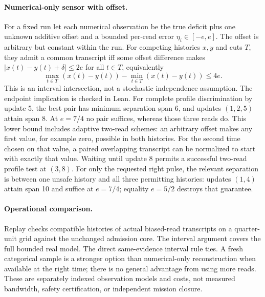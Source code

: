 \documentclass{article}
\begin{document}
\paragraph{Numerical-only sensor with offset.}
For a fixed run let each numerical observation be the true deficit
plus one unknown additive offset and a bounded per-read error
$\eta_i\in[-e,e]$. The offset is arbitrary but constant within the
run. For competing histories $x,y$ and cuts $T$, they admit a
common transcript iff some offset difference makes
$|x(t)-y(t)+\delta|\le 2e$ for all $t\in T$, equivalently
\[
 \max_{t\in T}(x(t)-y(t))-\min_{t\in T}(x(t)-y(t))\le4e.
\]
This is an interval intersection, not a stochastic independence
assumption. The endpoint implication is checked in Lean.
For complete profile discrimination by update 5, the best pair
has minimum separation span 6, and updates $(1,2,5)$ attain span
8. At $e=7/4$ no pair suffices, whereas those three reads do.
This lower bound includes adaptive two-read schemes: an arbitrary
offset makes any first value, for example zero, possible in
both histories. For the second time chosen on that value, a
paired overlapping transcript can be normalized to start with
exactly that value. Waiting until update 8 permits a successful
two-read profile test at $(3,8)$.
For only the requested right pulse, the relevant separation is
between one unsafe history and all three permitting histories:
updates $(1,4)$ attain span 10 and suffice at $e=7/4$; equality
$e=5/2$ destroys that guarantee.

\paragraph{Operational comparison.}
Replay checks compatible histories of actual biased-read transcripts
on a quarter-unit grid against the unchanged admission core. The
interval argument covers the full bounded real model. The direct
same-evidence interval rule ties. A fresh categorical sample is a
stronger option than numerical-only reconstruction when available
at the right time; there is no general advantage from using more
reads. These are separately indexed observation models and costs,
not measured bandwidth, safety certification, or independent
mission closure.
\end{document}
